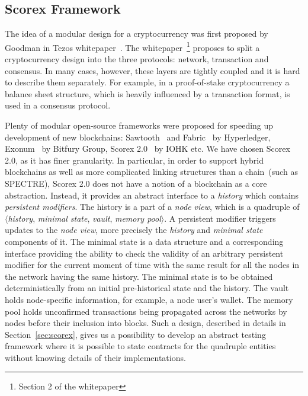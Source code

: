 
\subsection{Scorex Framework}

The idea of a modular design for a cryptocurrency was first proposed by Goodman in Tezos whitepaper~\cite{goodmantezos}. The whitepaper~\footnote{Section 2 of the whitepaper} proposes to split a cryptocurrency design into the three protocols: network, transaction and consensus. In many cases, however, these layers are tightly coupled and it is hard to describe them separately. For example, in a proof-of-stake cryptocurrency a balance sheet structure, which is heavily influenced by a transaction format, is used in a consensus protocol. 

Plenty of modular open-source frameworks were proposed for speeding up development of new blockchains: Sawtooth~\cite{sawtooth} and Fabric~\cite{fabric} by Hyperledger, Exonum~\cite{exonum} by Bitfury Group, Scorex 2.0~\cite{scorex} by IOHK etc. We have chosen Scorex 2.0, as it has finer granularity. In particular, in order to support hybrid blockchains as well as more complicated linking structures than a chain~(such as SPECTRE\cite{EPRINT:SomLewZoh16}), Scorex 2.0 does not have a notion of a blockchain as a core abstraction. Instead, it provides an abstract interface to a \textit{history} which contains \textit{persistent modifiers}. The history is a part of a \textit{node view}, which is a quadruple of $\langle$\textit{history}, \textit{minimal state}, \textit{vault}, \textit{memory pool}$\rangle$. A persistent modifier triggers updates to the \textit{node view}, more precisely the \textit{history} and \textit{minimal state} components of it. The minimal state is a data structure and a corresponding interface providing the ability to check the validity of an arbitrary persistent modifier for the current moment of time with the same result for all the nodes in the network having the same history. The minimal state is to be obtained deterministically from an initial pre-historical state and the history. The vault holds node-specific information, for example, a node user's wallet. The memory pool holds unconfirmed transactions being propagated across the networks by nodes before their inclusion into blocks. Such a design, described in details in Section~\ref{sec:scorex}, gives us a possibility to develop an abstract testing framework where it is possible to state contracts for the quadruple entities without knowing details of their implementations.